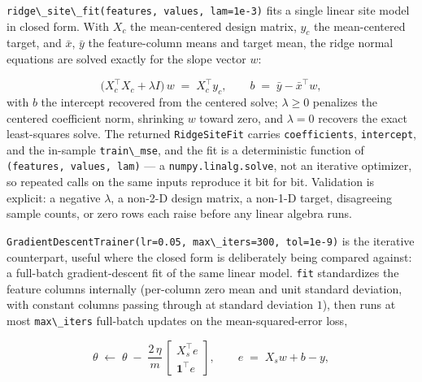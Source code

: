 \documentclass[
  10pt,
]{article}
\newcommand{\passthrough}[1]{#1}
\begin{document}
\passthrough{\lstinline!ridge\_site\_fit(features, values, lam=1e-3)!}
fits a single linear site model in closed form. With \(X_c\) the
mean-centered design matrix, \(y_c\) the mean-centered target, and
\(\bar{x}\), \(\bar{y}\) the feature-column means and target mean, the
ridge normal equations are solved exactly for the slope vector \(w\):

\begin{equation}
\label{eq:learn-ridge}
\bigl( X_c^{\!\top} X_c + \lambda I \bigr)\, w \;=\; X_c^{\!\top} y_c,
\qquad b \;=\; \bar{y} - \bar{x}^{\!\top} w,
\end{equation} with \(b\) the intercept recovered from the centered
solve; \(\lambda \geq 0\) penalizes the centered coefficient norm,
shrinking \(w\) toward zero, and \(\lambda = 0\) recovers the exact
least-squares solve. The returned \passthrough{\lstinline!RidgeSiteFit!}
carries \passthrough{\lstinline!coefficients!},
\passthrough{\lstinline!intercept!}, and the in-sample
\passthrough{\lstinline!train\_mse!}, and the fit is a deterministic
function of \passthrough{\lstinline!(features, values, lam)!} --- a
\passthrough{\lstinline!numpy.linalg.solve!}, not an iterative
optimizer, so repeated calls on the same inputs reproduce it bit for
bit. Validation is explicit: a negative \(\lambda\), a non-2-D design
matrix, a non-1-D target, disagreeing sample counts, or zero rows each
raise before any linear algebra runs.

\passthrough{\lstinline!GradientDescentTrainer(lr=0.05, max\_iters=300, tol=1e-9)!}
is the iterative counterpart, useful where the closed form is
deliberately being compared against: a full-batch gradient-descent fit
of the same linear model. \passthrough{\lstinline!fit!} standardizes the
feature columns internally (per-column zero mean and unit standard
deviation, with constant columns passing through at standard deviation
\(1\)), then runs at most \passthrough{\lstinline!max\_iters!}
full-batch updates on the mean-squared-error loss,

\begin{equation}
\label{eq:learn-gd}
\theta \;\leftarrow\; \theta \;-\; \frac{2\,\eta}{m}\,
\begin{bmatrix} X_s^{\!\top} e \\ \mathbf{1}^{\!\top} e \end{bmatrix},
\qquad e \;=\; X_s w + b - y,
\end{equation}
\end{document}
